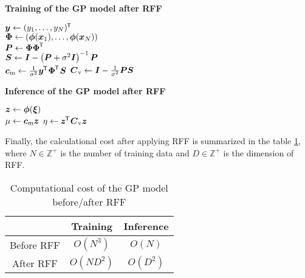 \documentclass[twocolumn, a4paper, 10pt]{article}
\begin{document}
\begin{algorithm}[t]
    \caption{\bf Training of the GP model after RFF}
    \label{alg:rffgp_train}
    $\boldsymbol{y} \gets (y_1, \ldots, y_N)^{\mkern-1.5mu\mathsf{T}}\hspace{0.5pt}$ \\
    $\boldsymbol{\Phi} \gets (\boldsymbol{\phi}(\boldsymbol{x}_1), \ldots, \boldsymbol{\phi}(\boldsymbol{x}_N))$ \\
    $\boldsymbol{P} \gets \boldsymbol{\Phi\Phi}^{\mkern-1.5mu\mathsf{T}}\hspace{0.5pt}$ \\
    $\boldsymbol{S} \gets \boldsymbol{I} - \left( \boldsymbol{P} + \sigma^2 \boldsymbol{I} \right)^{-1} \boldsymbol{P}$ \\
    $\boldsymbol{c}_\mathrm{m} \gets \frac{1}{\sigma^2} \boldsymbol{y}^{\mkern-1.5mu\mathsf{T}}\hspace{0.5pt} \boldsymbol{\Phi}^{\mkern-1.5mu\mathsf{T}}\hspace{0.5pt} \boldsymbol{S}$
    \hfill{}
    $\boldsymbol{C}_\mathrm{v} \gets \boldsymbol{I} - \frac{1}{\sigma^2} \boldsymbol{PS}$
    \hfill{}
\end{algorithm}

\begin{algorithm}[t]
    \caption{\bf Inference of the GP model after RFF}
    \label{alg:rffgp_infer}
    $\boldsymbol{z} \gets \boldsymbol{\phi}(\boldsymbol{\xi})$ \\
    $\mu \gets \boldsymbol{c}_\mathrm{m} \boldsymbol{z}$
    \hfill{}
    $\eta \gets \boldsymbol{z}^{\mkern-1.5mu\mathsf{T}}\hspace{0.5pt} \boldsymbol{C}_\mathrm{v} \boldsymbol{z}$
    \hfill{}
\end{algorithm}

Finally, the calculational cost after applying RFF is summarized in the table
\ref{tab:gp_complexity}, where $N \in \mathbb{Z}^{+}$ is the number of training data
and $D \in \mathbb{Z}^{+}$ is the dimension of RFF.

\begin{table}[t]
    \caption{Computational cost of the GP model before/after RFF}
    \label{tab:gp_complexity}
    \begin{center}\begin{tabular}{ccc}
        \hline
         & Training & Inference \\
        \hline
        Before RFF & $O(N^3)$   & $O(N)$   \\  
        After RFF  & $O(N D^2)$ & $O(D^2)$ \\
        \hline
    \end{tabular}\end{center}
\end{table}
\end{document}
